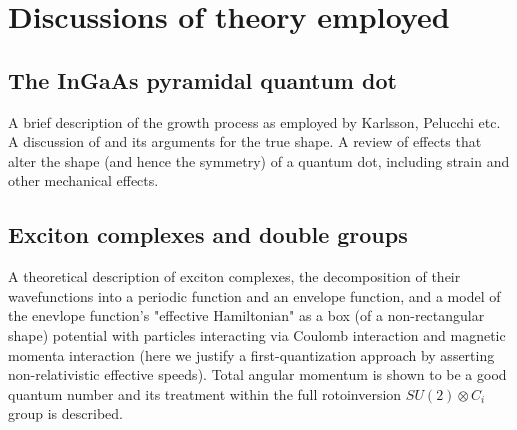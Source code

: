 \section{Discussions of theory employed}

\subsection{The InGaAs pyramidal quantum dot} \label{sec:growth}
A brief description of the growth process as employed by Karlsson, Pelucchi etc. A discussion of \cite{hexagon} and its arguments for the true shape. A review of effects that alter the shape (and hence the symmetry) of a quantum dot, including strain and other mechanical effects.

\subsection{Exciton complexes and double groups} \label{sec:exciton_theory}
A theoretical description of exciton complexes, the decomposition of their wavefunctions into a periodic function and an envelope function, and a model of the enevlope function's "effective Hamiltonian" as a box (of a non-rectangular shape) potential with particles interacting via Coulomb interaction and magnetic momenta interaction (here we justify a first-quantization approach by asserting non-relativistic effective speeds). Total angular momentum is shown to be a good quantum number and its treatment within the full rotoinversion $SU(2)\otimes C_i$ group is described.

